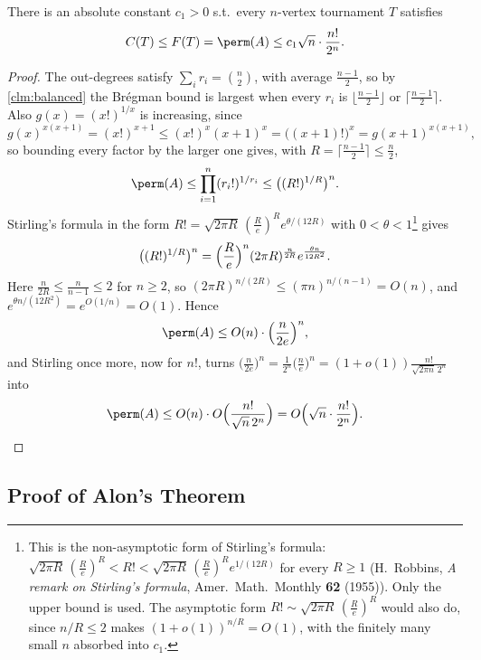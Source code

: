 \begin{lemma}\label{lem:perm-tournament}
    There is an absolute constant \(c_1 > 0\) s.t.\ every \(n\)-vertex tournament \(T\) satisfies
    \[
        C(T) \le F(T) = \perm(A) \le c_1 \sqrt{n} \cdot \frac{n!}{2^n}.
    \]
\end{lemma}

\begin{proof}
    The out-degrees satisfy \(\sum_i r_i = \binom{n}{2}\), with average \(\frac{n-1}{2}\), so by \autoref{clm:balanced} the Br\'egman bound is largest when every \(r_i\) is \(\lfloor \frac{n-1}{2} \rfloor\) or \(\lceil \frac{n-1}{2} \rceil\). Also \(g(x) = (x!)^{1/x}\) is increasing, since
    \[
        g(x)^{x(x+1)} = (x!)^{x+1} \le (x!)^{x} (x+1)^x = \bigl( (x+1)! \bigr)^{x} = g(x+1)^{x(x+1)},
    \]
    so bounding every factor by the larger one gives, with \(R = \lceil \frac{n-1}{2} \rceil \le \frac{n}{2}\),
    \[
        \perm(A) \le \prod_{i=1}^{n} (r_i!)^{1/r_i} \le \bigl( (R!)^{1/R} \bigr)^{n}.
    \]
    Stirling's formula in the form \(R! = \sqrt{2\pi R} \, (\frac{R}{e})^{R} e^{\theta/(12R)}\) with \(0 < \theta < 1\)\footnote{This is the non-asymptotic form of Stirling's formula: \(\sqrt{2\pi R} \, (\frac{R}{e})^{R} < R! < \sqrt{2\pi R} \, (\frac{R}{e})^{R} e^{1/(12R)}\) for every \(R \ge 1\) (H.~Robbins, \emph{A remark on Stirling's formula}, Amer.\ Math.\ Monthly \textbf{62} (1955)). Only the upper bound is used. The asymptotic form \(R! \sim \sqrt{2\pi R} \, (\frac{R}{e})^{R}\) would also do, since \(n/R \le 2\) makes \((1 + o(1))^{n/R} = O(1)\), with the finitely many small \(n\) absorbed into \(c_1\).} gives
    \[
        \bigl( (R!)^{1/R} \bigr)^{n} = \Bigl( \frac{R}{e} \Bigr)^{n} (2\pi R)^{\frac{n}{2R}} e^{\frac{\theta n}{12 R^2}}.
    \]
    Here \(\frac{n}{2R} \le \frac{n}{n-1} \le 2\) for \(n \ge 2\), so \((2\pi R)^{n/(2R)} \le (\pi n)^{n/(n-1)} = O(n)\), and \(e^{\theta n/(12R^2)} = e^{O(1/n)} = O(1)\). Hence
    \[
        \perm(A) \le O(n) \cdot \Bigl( \frac{n}{2e} \Bigr)^{n},
    \]
    and Stirling once more, now for \(n!\), turns \(\bigl( \frac{n}{2e} \bigr)^n = \frac{1}{2^n} \bigl( \frac{n}{e} \bigr)^n = (1 + o(1)) \frac{n!}{\sqrt{2\pi n} \, 2^n}\) into
    \[
        \perm(A) \le O(n) \cdot O\Bigl( \frac{n!}{\sqrt{n} \, 2^n} \Bigr) = O\Bigl( \sqrt{n} \cdot \frac{n!}{2^n} \Bigr). \qedhere
    \]
\end{proof}

\subsection{Proof of Alon's Theorem}

